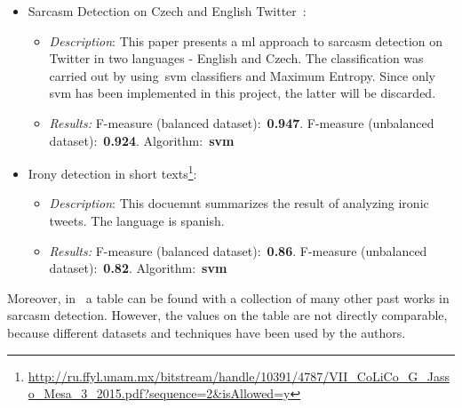 \begin{itemize}
	\item Sarcasm Detection on Czech and English Twitter~\cite{ptavcek2014sarcasm}:
	\begin{itemize}
		\item \textit{Description}: This paper presents a \ac{ml} approach to sarcasm detection on Twitter in two languages - English and Czech. The classification was carried out by using~\ac{svm} classifiers and Maximum Entropy. Since only \ac{svm} has been implemented in this project, the latter will be discarded.
		\item \textit{Results:} F-measure (balanced dataset):~\textbf{0.947}. F-measure (unbalanced dataset):~\textbf{0.924}. Algorithm:~\textbf{\ac{svm}}
	\end{itemize}
	\item Irony detection in short texts\footnote{\url{ http://ru.ffyl.unam.mx/bitstream/handle/10391/4787/VII_CoLiCo_G_Jasso_Mesa_3_2015.pdf?sequence=2&isAllowed=y}}:
	\begin{itemize}
		\item \textit{Description}: This docuemnt summarizes the result of analyzing ironic tweets. The language is spanish.
		\item \textit{Results:} F-measure (balanced dataset):~\textbf{0.86}. F-measure (unbalanced dataset):~\textbf{0.82}. Algorithm:~\textbf{\ac{svm}}
	\end{itemize}
	
\end{itemize}
Moreover, in~\cite{joshi2017automatic} a table can be found with a collection of many other past works in sarcasm detection. However, the values on the table are not directly comparable, because different datasets and techniques have been used by the authors.\\
